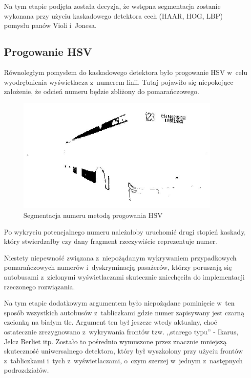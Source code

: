 Na tym etapie podjęta została decyzja, że wstępna segmentacja
zostanie wykonana przy użyciu kaskadowego detektora cech (HAAR, HOG, LBP)
pomysłu panów Violi i~Jonesa.

\subsection{Progowanie HSV}

Równoległym pomysłem do kaskadowego detektora było progowanie HSV 
w~celu wyodrębnienia wyświetlacza z~numerem linii. Tutaj pojawiło
się niepokojące założenie, że odcień numeru będzie zbliżony do
pomarańczowego. 

\begin{figure}[h!]
    \caption{Segmentacja numeru metodą progowania HSV}
    \centering
    \includegraphics[width=0.9\textwidth]{img/exp_hsv_threshold_number_detector}
\end{figure}

Po wykryciu potencjalnego numeru należałoby uruchomić drugi stopień
kaskady, który stwierdzałby czy dany fragment rzeczywiście reprezentuje
numer.

Niestety niepewność związana z~niepożądanym wykrywaniem przypadkowych
pomarańczowych numerów i~dyskryminacją pasażerów, którzy
poruszają się autobusami z~zielonymi wyświetlaczami skutecznie
zniechęciła do implementacji rzeczonego rozwiązania.

Na tym etapie dodatkowym argumentem było niepożądane 
pominięcie w~ten sposób
wszystkich autobusów z~tabliczkami gdzie numer zapisywany jest czarną
czcionką na białym tle. Argument ten był jeszcze wtedy aktualny, choć
ostatecznie zrezygnowano z~wykrywania frontów tzw. ,,starego typu'' -
Ikarus, Jelcz Berliet itp. Zostało to pośrednio wymuszone przez 
znacznie mniejszą skuteczność uniwersalnego detektora, który był
wyszkolony przy użyciu frontów z~tabliczkami i~tych z~wyświetlaczami, 
o~czym szerzej w~jednym z~następnych podrozdziałów.


